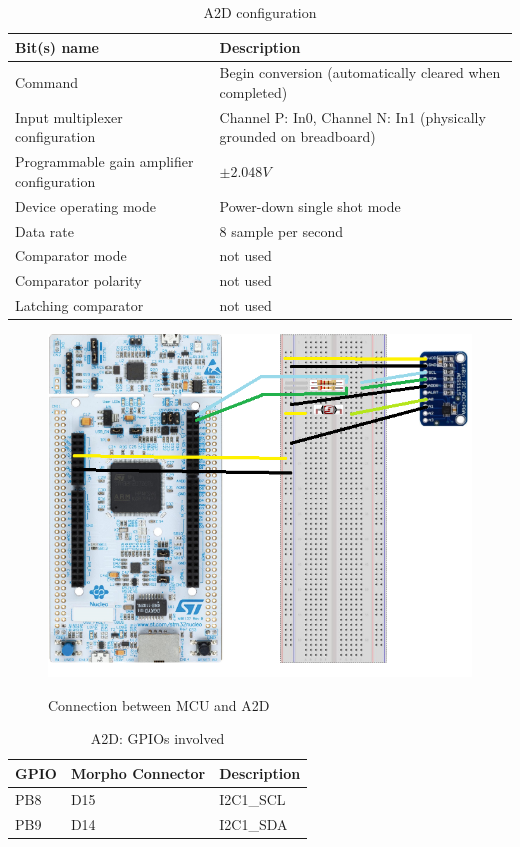 \begin{table}[H]
\centering
\begin{tabular}{p{}p{}}

\textbf{Bit(s) name}&\textbf{Description}\\ \hline
Command & Begin conversion (automatically cleared when completed) \\ 
Input multiplexer configuration & Channel P: In0, Channel N: In1 (physically grounded on breadboard)\\ 
Programmable gain amplifier configuration & $\pm 2.048V$\\
Device operating mode & Power-down single shot mode\\
Data rate & 8 sample per second \\
Comparator mode & not used \\
Comparator polarity & not used \\
Latching comparator & not used \\ \hline
\end{tabular}
\caption{A2D configuration}
\end{table}

\begin{figure}[H]
\centering
\includegraphics{Immagini/07}
\label{07}
\caption{Connection between MCU and A2D}
\end{figure}

\begin{table}[H]
\centering
\begin{tabular}{p{}p{}p{}}

\textbf{GPIO}&\textbf{Morpho Connector}&\textbf{Description}\\ \hline
PB8 & D15 & I2C1\_SCL\\ 
PB9 & D14 & I2C1\_SDA\\ 
\hline
\end{tabular}
\caption{A2D: GPIOs involved}
\end{table}

